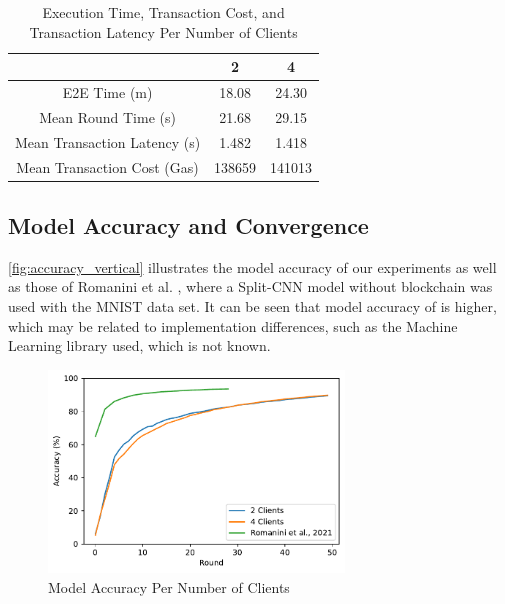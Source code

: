\begin{table}[!ht]
\begin{tabular}{c|c|c} \hline \hline
                                & 2             & 4             \\ \hline \hline
E2E Time (m)                    & 18.08         &	24.30       \\ \hline
Mean Round Time (s)             & 21.68         &	29.15       \\ \hline
Mean Transaction Latency (s)    & 1.482         &	1.418       \\ \hline
Mean Transaction Cost (Gas)     & 138659        &	141013      \\ \hline
\end{tabular}
\caption{Execution Time, Transaction Cost, and Transaction Latency Per Number of Clients}
\label{tab:metrics_vertical}
\end{table}

\subsection{Model Accuracy and Convergence}

\autoref{fig:accuracy_vertical} illustrates the model accuracy of our experiments as well as those of Romanini et al. \cite{10.48550/arxiv.2104.00489}, where a Split-CNN model without blockchain was used with the MNIST data set. It can be seen that model accuracy of \cite{10.48550/arxiv.2104.00489} is higher, which may be related to implementation differences, such as the Machine Learning library used, which is not known.

\begin{figure}[!ht]
    \centering
    \centering
    \includegraphics[width=0.7\textwidth]{graphics/vertical/accuracy.pdf}
    \caption{Model Accuracy Per Number of Clients}
    \label{fig:accuracy_vertical}
\end{figure}

